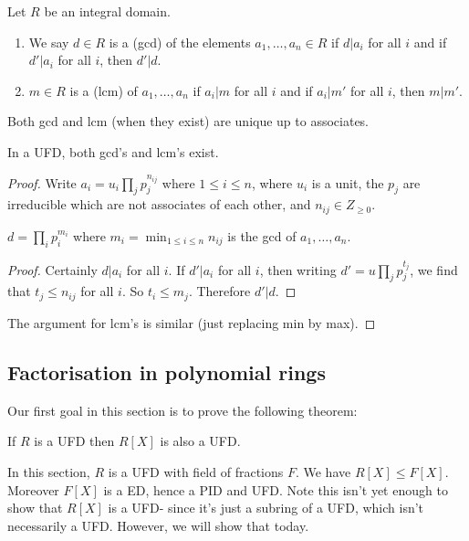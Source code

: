 \documentclass[egregdoesnotlikesansseriftitles,a4paper]{scrartcl}
\begin{document}
\begin{definition*}
       Let $R$ be an integral domain.
       \begin{enumerate}
             \item We say $d \in R$ is a  (gcd) of the elements $a_1 , \ldots, a_n \in R$ if $d|a_{i}$ for all $i$ and if $d' | a_i$ for all $i$, then $d' |d$.
             \item $m \in R$ is a  (lcm) of $a_1 ,\ldots ,a_n$ if $a_{i}|m$ for all $i$ and if $a_i| m'$ for all $i$, then $m|m'$.
       \end{enumerate}
       Both gcd and lcm (when they exist) are unique up to associates.
\end{definition*}
\begin{proposition}
       In a UFD, both gcd's and lcm's exist.
       \begin{proof}
            Write $a_i = u_i \prod_{j}p_{j}^{n_{ij}}$ where $1 \leq i \leq n$, where $u_{i}$ is a unit, the $p_{j}$ are irreducible which are not associates of each other, and $n_{ij}\in Z_{\geq 0}$. 
            \begin{claim}
                  $d=\prod_{i}{p_{i}^{m_i}}$ where $m_i=\min_{1 \leq i \leq n} n_{ij}$ is the gcd of $a_1 , \ldots, a_n$.
            \end{claim}
            \begin{proof}
                  Certainly $d| a_{i}$ for all $i$. If $d'|a_{i}$ for all $i$, then writing $d'=u \prod_j p_{j}^{t_{j}} $, we find that $t_{j}\leq n_{ij}$ for all $i$. So $t_i \leq m_j$. Therefore $d' |d$. 
            \end{proof}
            The argument for lcm's is similar (just replacing min by max).
     \end{proof}
\end{proposition}
\newpage
\subsection{Factorisation in polynomial rings}
\begin{goal}
      Our first goal in this section is to prove the following theorem:
\end{goal}
\begin{theorem}\label{polyUFD}
       If $R$ is a UFD then $R[X]$ is also a UFD.
\end{theorem}
In this section, $R$ is a UFD with field of fractions $F$. We have $R[X] \leq F[X]$. Moreover $F[X]$ is a ED, hence a PID and UFD. Note this isn't yet enough to show that $R[X]$ is a UFD- since it's just a subring of a UFD, which isn't necessarily a UFD. However, we will show that today.
\end{document}

